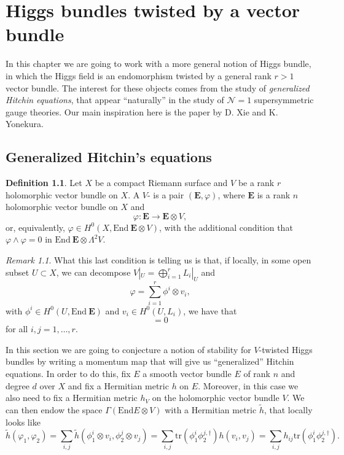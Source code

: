 \documentclass[12pt,a4paper]{book}
\theoremstyle{definition} \newtheorem{defn}[thm]{Definition}
\theoremstyle{definition} \newtheorem{ejemplo}[thm]{Example}
\theoremstyle{remark} \newtheorem{rem}[thm]{Remark}
\def\tr{\mathrm{tr}}
\def\End{\mathrm{End}}
\newcommand{\ve}[1]{\mathbf{#1}}
\let\emph\relax
\begin{document}
    \chapter{Higgs bundles twisted by a vector bundle}
    In this chapter we are going to work with a more general notion of Higgs bundle, in which the Higgs field is an endomorphism twisted by a general rank $r>1$ vector bundle. The interest for these objects comes from the study of \textit{generalized Hitchin equations}, that appear ``naturally'' in the study of $\mathcal{N}=1$ supersymmetric gauge theories. Our main inspiration here is the paper \cite{xieyonekura} by D. Xie and K. Yonekura.

    \section{Generalized Hitchin's equations}

    \begin{defn}
      Let $X$ be a compact Riemann surface and $V$ be a rank $r$ holomorphic vector bundle on $X$. A $V$-\emph{twisted Higgs bundle} is a pair $(\ve{E},\varphi)$, where $\ve{E}$ is a rank $n$ holomorphic vector bundle on $X$ and
      \begin{equation*}
	\varphi: \ve{E} \longrightarrow \ve{E} \otimes V,
      \end{equation*}
      or, equivalently, $\varphi \in H^0(X,\End\ \ve{E} \otimes V)$, with the additional condition that 
      $	\varphi \wedge \varphi =0$ in $\End\ \ve{E} \otimes \Lambda^2 V$.
    \end{defn}

    \begin{rem}
      What this last condition is telling us is that, if locally, in some open subset $U\subset X$, we can decompose $V|_U=\bigoplus_{i=1}^r L_i|_U$ and 
      \begin{equation*}
	\varphi= \sum_{i=1}^r \phi^i \otimes v_i,
      \end{equation*}
      with $\phi^i \in H^0(U,\End\ \ve{E})$ and $v_i \in H^0(U,L_i)$, we have that
      \begin{equation*}
	[\phi^i,\phi^j]=0
      \end{equation*}
      for all $i,j=1,\dots,r$.
    \end{rem}

    In this section we are going to conjecture a notion of stability for $V$-twisted Higgs bundles by writing a momentum map that will give us ``generalized'' Hitchin equations. In order to do this, fix $E$ a smooth vector bundle $E$ of rank $n$ and degree $d$ over $X$ and fix a Hermitian metric $h$ on $E$. Moreover, in this case we also need to fix a Hermitian metric $h_V$ on the holomorphic vector bundle $V$. We can then endow the space $\Gamma(\End E \otimes V)$ with a Hermitian metric $\tilde{h}$, that locally looks like
    \begin{equation*}
      \tilde{h}(\varphi_1,\varphi_2)=\sum_{i,j} \tilde{h}(\phi_1^i\otimes v_i,\phi_2^j\otimes v_j)=\sum_{i,j} \tr(\phi_1^i\phi_2^{j,\dagger}) h(v_i,v_j)=\sum_{i,j}h_{ij} \tr(\phi_1^i\phi_2^{j,\dagger}).
    \end{equation*}
\end{document}
